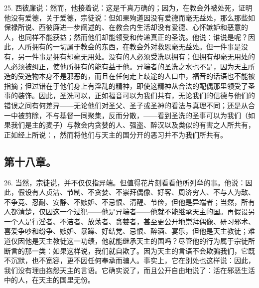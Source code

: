 25. 西彼廉说：然而，他接着说：这是千真万确的；因为，在教会外被处死，证明他没有爱德，关于爱德，宗徒说：但如果殉道因没有爱德而毫无益处，那么那些如保禄所说、西彼廉进一步阐述的、在教会内生活却没有爱德、心怀嫉妒和恶意的人，也同样不能获益；然而他们却能领受和传递真正的圣洗。他说：谁说是呢？因此，人所拥有的一切属于教会的东西，在教会外对救恩毫无益处。但一件事是没有，另一件事是拥有却毫无用处。没有的人必须受洗以拥有；但拥有却毫无用处的人必须被纠正，使他所拥有的能有益于他。异端者的圣洗之水也不是，因为天主所造的受造物本身不是邪恶的，而且在任何走上歧途的人口中，福音的话语也不能被指摘；但过错在于他们身上有淫乱的精神，即使这精神从合法的配偶那里领受了圣事的装饰。因此，圣洗可以，正如福音可以为我们共有，无论我们的信德与他们的错误之间有何差异——无论他们对圣父、圣子或圣神的看法与真理不同；还是从合一中被剪除，不与基督一同聚集，反而分散，——看到圣洗的圣事可以为我们（如果我们是主的麦子）与教会内贪婪的人、强盗、醉汉以及类似的有害之人所共有，正如经上所说：，然而将他们与天主的国分开的恶习并不为我们所共有。\par


\subsection{第十八章。}

26. 当然，宗徒说，并不仅仅指异端。但值得花片刻看看他所列举的事。他说：因此，假设有人贞洁、节制、不贪婪、不崇拜偶像、好客、周济穷人、不与人为敌、不争竞、忍耐、安静、不嫉妒、不忌恨、清醒、节俭，但他是异端者；当然，所有人都清楚，仅因这一个过犯——他是异端者——他就不能继承天主的国。再假设另一个人是行淫者、不洁者、放荡者、贪婪者，甚至更公开地崇拜偶像、研习邪术、喜爱争吵和纷争、嫉妒、暴躁、好结党、忌恨、醉酒、宴乐，但他是天主教徒；难道仅因他是天主教徒这一功绩，他就能继承天主的国吗？尽管他的行为属于宗徒所断言的那一类：如果这样说，我们就自欺了。因为天主的言语不会欺骗我们，它既不沉默，也不宽容，更不因任何奉承而骗人。事实上，它在别处也这样说：因此，我们没有理由抱怨天主的言语。它确实说了，而且公开自由地说了：活在邪恶生活中的人，在天主的国里无份。\par

